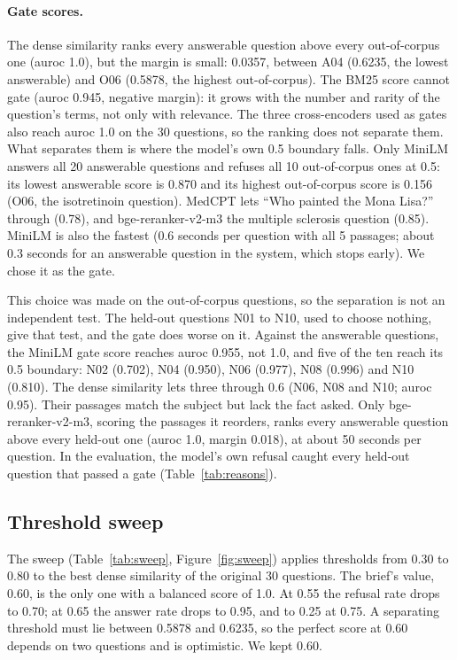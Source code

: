 \paragraph{Gate scores.} The dense similarity ranks every answerable question above every out-of-corpus one (auroc 1.0), but the margin is small: 0.0357, between A04 (0.6235, the lowest answerable) and O06 (0.5878, the highest out-of-corpus). The BM25 score cannot gate (auroc 0.945, negative margin): it grows with the number and rarity of the question's terms, not only with relevance. The three cross-encoders used as gates also reach auroc 1.0 on the 30 questions, so the ranking does not separate them. What separates them is where the model's own 0.5 boundary falls. Only MiniLM answers all 20 answerable questions and refuses all 10 out-of-corpus ones at 0.5: its lowest answerable score is 0.870 and its highest out-of-corpus score is 0.156 (O06, the isotretinoin question). MedCPT lets ``Who painted the Mona Lisa?'' through (0.78), and bge-reranker-v2-m3 the multiple sclerosis question (0.85). MiniLM is also the fastest (0.6 seconds per question with all 5 passages; about 0.3 seconds for an answerable question in the system, which stops early). We chose it as the gate.

This choice was made on the out-of-corpus questions, so the separation is not an independent test. The held-out questions N01 to N10, used to choose nothing, give that test, and the gate does worse on it. Against the answerable questions, the MiniLM gate score reaches auroc 0.955, not 1.0, and five of the ten reach its 0.5 boundary: N02 (0.702), N04 (0.950), N06 (0.977), N08 (0.996) and N10 (0.810). The dense similarity lets three through 0.6 (N06, N08 and N10; auroc 0.95). Their passages match the subject but lack the fact asked. Only bge-reranker-v2-m3, scoring the passages it reorders, ranks every answerable question above every held-out one (auroc 1.0, margin 0.018), at about 50 seconds per question. In the evaluation, the model's own refusal caught every held-out question that passed a gate (Table~\ref{tab:reasons}).

\subsection{Threshold sweep}
\label{sec:sweep}




The sweep (Table~\ref{tab:sweep}, Figure~\ref{fig:sweep}) applies thresholds from 0.30 to 0.80 to the best dense similarity of the original 30 questions. The brief's value, 0.60, is the only one with a balanced score of 1.0. At 0.55 the refusal rate drops to 0.70; at 0.65 the answer rate drops to 0.95, and to 0.25 at 0.75. A separating threshold must lie between 0.5878 and 0.6235, so the perfect score at 0.60 depends on two questions and is optimistic. We kept 0.60.

